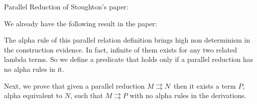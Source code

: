 \documentclass{article}
\newcommand{\p}{\ensuremath{\rightrightarrows}}
\begin{document}
Parallel Reduction of Stoughton's paper:


We already have the following result in the paper:


The alpha rule of this parallel relation definition brings high non determinism in the construction evidence. In fact, infinite of them exists for any two related lambda terms.
So we define a predicate that holds only if a parallel reduction has no alpha rules in it.


Next, we prove that given a parallel reduction $M \p N$\ then it exists a term $P$, alpha equivalent to $N$, such that $M \p P$ with no alpha rules in the derivations. 

\end{document}
